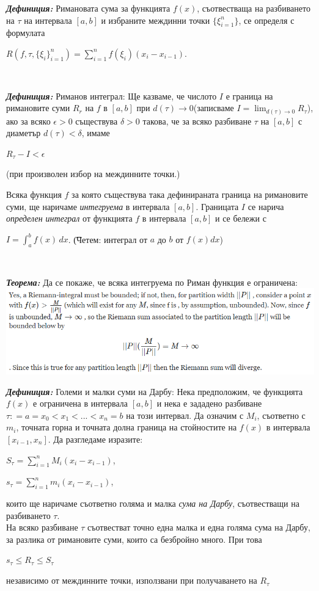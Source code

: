 \documentclass[11pt]{article} %
\newcommand{\italicBold}[1]{\textbf{\emph{#1}}}
\newcommand{\definition}{\italicBold{Дефиниция: }}
\newcommand{\theorem}{\italicBold{Теорема: }}
\newcommand{\integral}[4]{\displaystyle \int_{#1}^{#2}#3\,#4}
\newcommand{\curlies}[1]{\{#1\}}
\begin{document}
\definition Римановата сума за функцията $f(x)$, съотвестваща на разбиването на $\tau$ на интервала $[a,b]$ и избраните междинни точки $\curlies{\xi^{n}_{i=1}}$, се определя с формулата\\
\centerline{$R(f,\tau,\curlies{\xi_{i}}^{n}_{i=1})=\displaystyle\sum_{i=1}^{n}f(\xi_{i})(x_{i}-x_{i-1})$.}\\\par

\definition Риманов интеграл: Ще казваме, че числото $I$ е граница на римановите суми $R_{r}$ на $f$ в $[a,b]$ при $d(\tau) \to 0$(записваме $I = \lim_{d(\tau)\to 0}R_{\tau}$), ако за всяко $\epsilon > 0$ съществува $\delta > 0$ такова, че за всяко разбиване $\tau$ на $[a,b]$ с диаметър $d(\tau)<\delta$, имаме \\
\centerline{$R_{\tau}-I < \epsilon$}
(при произволен избор на междинните точки.)\par
Всяка функция $f$ за която съществува така дефинираната граница на римановите суми, ще наричаме \textit{интегруема} в интервала $[a,b]$. Границата $I$ се нарича \textit{определен интеграл} от функцията $f$ в интервала $[a,b]$ и се бележи с \\
\centerline{$I = \integral{a}{b}{f(x)}{dx}$. \t (Четем: интеграл от $a$ до $b$ от $f(x)dx$)}\\\par

\theorem Да се покаже, че всяка интегруема по Риман функция е ограничена:\\
\includegraphics[scale=0.85]{RiemannBounded.png}

\definition Големи и малки суми на Дарбу: Нека предположим, че функцията $f(x)$ е ограничена в интервала $[a,b]$ и нека е зададено разбиване $\tau: = a=x_{0}<x_{1}<...<x_{n}=b$ на този интервал. Да означим с $M_{i}$, съответно с $m_{i}$, точната горна и точната долна граница на стойностите на $f(x)$ в интервала $[x_{i-1},x_{n}]$. Да разгледаме изразите:\\
\centerline{$S_{\tau} = \displaystyle \sum_{i=1}^{n}M_{i}(x_{i}-x_{i-1})$,}
\centerline{$s_{\tau} = \displaystyle \sum_{i=1}^{n}m_{i}(x_{i}-x_{i-1})$,}
които ще наричаме съответно голяма и малка \textit{сума на Дарбу}, съотвестващи на разбиването $\tau$.\\
На всяко разбиване $\tau$ съотвестват точно една малка и една голяма сума на Дарбу, за разлика от римановите суми, които са безбройно много. При това \\
\centerline{$s_{\tau}\leq R_{\tau}\leq S_{\tau}$}
независимо от междинните точки, използвани при получаването на $R_{\tau}$\\\par
\end{document}
